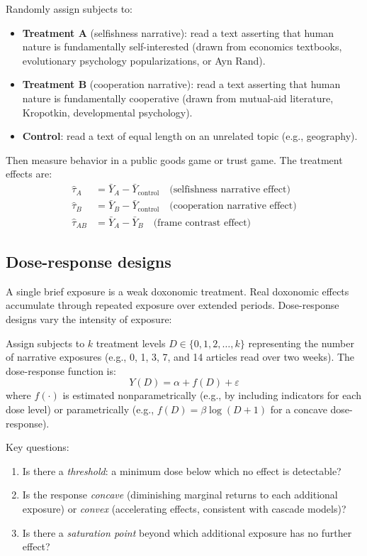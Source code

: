\begin{model}
\label{mod:priming}
Randomly assign subjects to:
\begin{itemize}[nosep]
  \item \textbf{Treatment A} (selfishness narrative): read a text asserting that human nature is fundamentally self-interested (drawn from economics textbooks, evolutionary psychology popularizations, or Ayn Rand).
  \item \textbf{Treatment B} (cooperation narrative): read a text asserting that human nature is fundamentally cooperative (drawn from mutual-aid literature, Kropotkin, developmental psychology).
  \item \textbf{Control}: read a text of equal length on an unrelated topic (e.g., geography).
\end{itemize}
Then measure behavior in a public goods game or trust game.
The treatment effects are:
\begin{align}
  \hat{\tau}_A &= \bar{Y}_A - \bar{Y}_{\text{control}} \quad \text{(selfishness narrative effect)} \\
  \hat{\tau}_B &= \bar{Y}_B - \bar{Y}_{\text{control}} \quad \text{(cooperation narrative effect)} \\
  \hat{\tau}_{AB} &= \bar{Y}_A - \bar{Y}_B \quad \text{(frame contrast effect)}
\end{align}
\end{model}

\subsection{Dose-response designs}

A single brief exposure is a weak doxonomic treatment.
Real doxonomic effects accumulate through repeated exposure over extended periods.
Dose-response designs vary the intensity of exposure:

\begin{model}
\label{mod:dose-response}
Assign subjects to $k$ treatment levels $D \in \{0, 1, 2, \ldots, k\}$ representing the number of narrative exposures (e.g., 0, 1, 3, 7, and 14 articles read over two weeks).
The dose-response function is:
\[
  Y(D) = \alpha + f(D) + \varepsilon
\]
where $f(\cdot)$ is estimated nonparametrically (e.g., by including indicators for each dose level) or parametrically (e.g., $f(D) = \beta \log(D + 1)$ for a concave dose-response).

Key questions:
\begin{enumerate}[nosep]
  \item Is there a \emph{threshold}: a minimum dose below which no effect is detectable?
  \item Is the response \emph{concave} (diminishing marginal returns to each additional exposure) or \emph{convex} (accelerating effects, consistent with cascade models)?
  \item Is there a \emph{saturation point} beyond which additional exposure has no further effect?
\end{enumerate}
\end{model}

